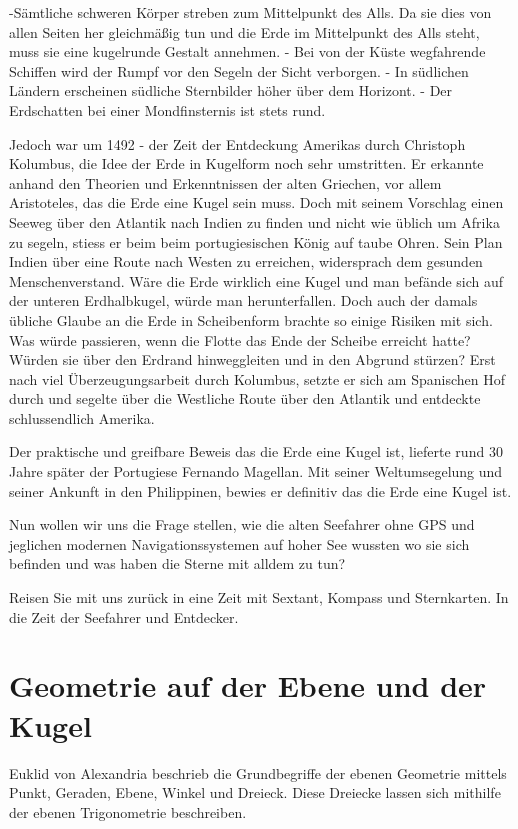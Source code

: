 \begin{refsection}
-Sämtliche schweren Körper streben zum Mittelpunkt des Alls. Da sie dies von allen Seiten her gleichmäßig tun und die Erde im Mittelpunkt des Alls steht, muss sie eine kugelrunde Gestalt annehmen.
- Bei von der Küste wegfahrende Schiffen wird der Rumpf vor den Segeln der Sicht verborgen.
- In südlichen Ländern erscheinen südliche Sternbilder höher über dem Horizont.
- Der Erdschatten bei einer Mondfinsternis ist stets rund.

Jedoch war um 1492 - der Zeit der Entdeckung Amerikas durch Christoph Kolumbus, die Idee der Erde in Kugelform noch sehr umstritten. Er erkannte anhand den Theorien und Erkenntnissen der alten Griechen, vor allem Aristoteles, das die Erde eine Kugel sein muss. 
Doch mit seinem Vorschlag einen Seeweg über den Atlantik nach Indien zu finden und nicht wie üblich um Afrika zu segeln, stiess er beim beim portugiesischen König auf taube Ohren. Sein Plan Indien über eine Route nach Westen zu erreichen, widersprach dem gesunden Menschenverstand. Wäre die Erde wirklich eine Kugel und man befände sich auf der unteren Erdhalbkugel, würde man herunterfallen.
Doch auch der damals übliche Glaube an die Erde in Scheibenform brachte so einige Risiken mit sich. Was würde passieren, wenn die Flotte das Ende der Scheibe erreicht hatte? Würden sie über den Erdrand hinweggleiten und in den Abgrund stürzen?
Erst nach viel Überzeugungsarbeit durch Kolumbus, setzte er sich am Spanischen Hof durch und segelte über die Westliche Route über den Atlantik und entdeckte schlussendlich Amerika.

Der praktische und greifbare Beweis das die Erde eine Kugel ist, lieferte rund 30 Jahre später der Portugiese Fernando Magellan. Mit seiner Weltumsegelung und seiner Ankunft in den Philippinen, bewies er definitiv das die Erde eine Kugel ist.

Nun wollen wir uns die Frage stellen, wie die alten Seefahrer ohne GPS und jeglichen modernen Navigationssystemen auf hoher See wussten wo sie sich befinden und was haben die Sterne mit alldem zu tun?

Reisen Sie mit uns zurück in eine Zeit mit Sextant, Kompass und Sternkarten. In die Zeit der Seefahrer und Entdecker.


\section{Geometrie auf der Ebene und der Kugel}

Euklid von Alexandria beschrieb die Grundbegriffe der ebenen Geometrie mittels Punkt, Geraden, Ebene, Winkel und Dreieck. Diese Dreiecke lassen sich mithilfe der ebenen Trigonometrie beschreiben.


\end{refsection}
